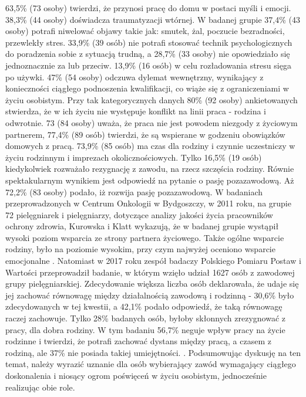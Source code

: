 \documentclass[a4paper,12pt,twoside,openright]{mwrep}
\begin{document}
  63,5\%  (73 osoby) twierdzi, że przynosi pracę do domu w postaci myśli i emocji. 38,3\% (44 osoby) doświadcza traumatyzacji wtórnej. W badanej grupie 37,4\%  (43 osoby) potrafi niwelować objawy takie jak: smutek, żal, poczucie bezradności, przewlekły stres. 33,9\%  (39 osób) nie potrafi stosować technik psychologicznych do poradzenia sobie z sytuacją trudną, a 28,7\%  (33 osoby) nie opowiedziało się jednoznacznie za lub przeciw. 13,9\% (16 osób) w celu rozładowania stresu sięga po używki. 47\% (54 osoby) odczuwa dylemat wewnętrzny, wynikający z konieczności ciągłego podnoszenia kwalifikacji, co wiąże się z ograniczeniami w życiu osobistym. Przy tak kategorycznych danych 80\% (92 osoby) ankietowanych stwierdza, że w ich życiu nie występuje konflikt na linii praca - rodzina i odwrotnie. 73 (84 osoby) uważa, że praca nie jest powodem niezgody z życiowym partnerem, 77,4\%  (89 osób) twierdzi, że są wspierane w godzeniu obowiązków domowych z pracą. 73,9\% (85 osób) ma czas dla rodziny i czynnie uczestniczy w życiu rodzinnym i imprezach okolicznościowych. Tylko 16,5\% (19 osób) kiedykolwiek rozważało rezygnację z zawodu, na rzecz szczęścia rodziny. Równie spektakularnym wynikiem jest odpowiedź na pytanie o pasję pozazawodową. Aż 72,2\% (83 osoby) podało, iż rozwija pasję pozazawodową.  W badaniach  przeprowadzonych w Centrum Onkologii w Bydgoszczy, w 2011 roku, na grupie 72 pielęgniarek i pielęgniarzy, dotyczące analizy jakości życia pracowników ochrony zdrowia, Kurowska i Klatt  wykazują, że w badanej grupie wystąpił wysoki poziom wsparcia ze strony partnera życiowego. Także ogólne wsparcie rodziny, było na poziomie wysokim, przy czym najwyżej oceniono wsparcie emocjonalne \cite{poziom}. Natomiast w 2017 roku zespół badaczy Polskiego Pomiaru Postaw i Wartości przeprowadził badanie, w którym wzięło udział 1627 osób z zawodowej grupy pielęgniarskiej. Zdecydowanie większa liczba osób deklarowała, że udaje się jej zachować równowagę między działalnością zawodową i rodzinną - 30,6\% było zdecydowanych w tej kwestii, a 42,1\% podało odpowiedź, że taką równowagę raczej zachowuje. Tylko 28\% badanych osób, byłoby skłonnych zrezygnować z pracy, dla dobra rodziny. W tym badaniu  56,7\% neguje wpływ pracy na życie rodzinne i twierdzi, że potrafi zachować dystans między pracą, a czasem z rodziną, ale 37\% nie posiada takiej umiejętności. \cite{komunikat}.
Podsumowując dyskusję na ten temat, należy wyrazić uznanie dla osób wybierający zawód wymagający ciągłego doskonalenia i niosący ogrom poświęceń w życiu osobistym, jednocześnie realizując obie role.
\end{document}

